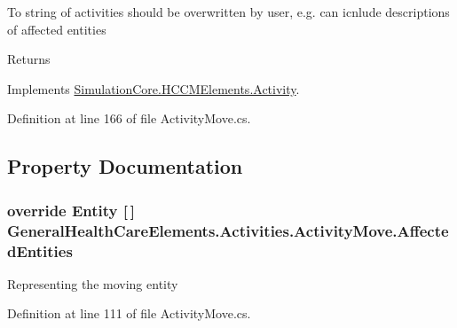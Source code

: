 To string of activities should be overwritten by user, e.\+g. can icnlude descriptions of affected entities 

\begin{DoxyReturn}{Returns}

\end{DoxyReturn}


Implements \hyperlink{class_simulation_core_1_1_h_c_c_m_elements_1_1_activity_a352124cf18f8505e51c8847a71769f7d}{Simulation\+Core.\+H\+C\+C\+M\+Elements.\+Activity}.



Definition at line 166 of file Activity\+Move.\+cs.



\subsection{Property Documentation}
\subsubsection[{\texorpdfstring{Affected\+Entities}{AffectedEntities}}]{\setlength{\rightskip}{0pt plus 5cm}override {\bf Entity} \mbox{[}$\,$\mbox{]} General\+Health\+Care\+Elements.\+Activities.\+Activity\+Move.\+Affected\+Entities\hspace{0.3cm}{\ttfamily [get]}}\hypertarget{class_general_health_care_elements_1_1_activities_1_1_activity_move_acdeb22823ca3db2001c40561380206cb}{}\label{class_general_health_care_elements_1_1_activities_1_1_activity_move_acdeb22823ca3db2001c40561380206cb}


Representing the moving entity 



Definition at line 111 of file Activity\+Move.\+cs.

